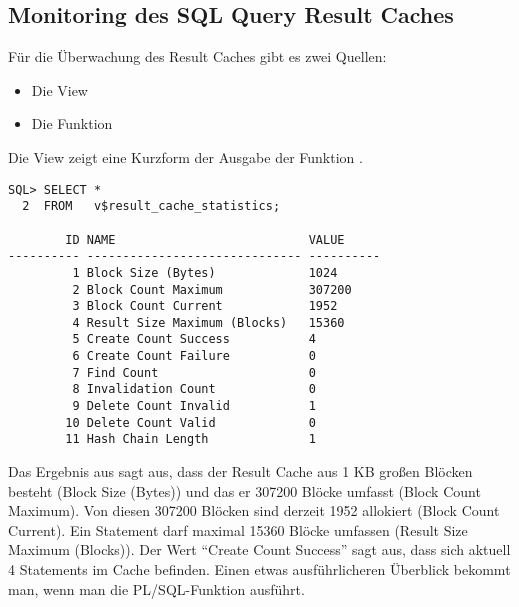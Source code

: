       \subsection{Monitoring des SQL Query Result Caches}
        F\"ur die \"Uberwachung des Result Caches gibt es zwei Quellen:
        \begin{itemize}
          \item Die View 
          \item Die Funktion 
        \end{itemize}
        Die View  zeigt eine Kurzform der Ausgabe der Funktion .
        \begin{lstlisting}[caption={\identifier{v\$result\_cache\_statistics}},label=admin706,language=oracle_sql]
SQL> SELECT *
  2  FROM   v$result_cache_statistics;

        ID NAME                           VALUE
---------- ------------------------------ ----------
         1 Block Size (Bytes)             1024
         2 Block Count Maximum            307200
         3 Block Count Current            1952
         4 Result Size Maximum (Blocks)   15360
         5 Create Count Success           4
         6 Create Count Failure           0
         7 Find Count                     0
         8 Invalidation Count             0
         9 Delete Count Invalid           1
        10 Delete Count Valid             0
        11 Hash Chain Length              1
        \end{lstlisting}
        Das Ergebnis aus  sagt aus, dass der Result Cache aus
        1 KB gro\ss{}en Bl\"ocken besteht (Block Size (Bytes)) und das er 307200
        Bl\"ocke umfasst (Block Count Maximum). Von diesen 307200 Bl\"ocken sind
        derzeit 1952 allokiert (Block Count Current). Ein Statement darf maximal
        15360 Bl\"ocke umfassen (Result Size Maximum (Blocks)). Der Wert
        \enquote{Create Count Success} sagt aus, dass sich aktuell 4 Statements
        im Cache befinden. Einen etwas ausf\"uhrlicheren \"Uberblick bekommt
        man, wenn man die PL/SQL-Funktion
         ausf\"uhrt.
\clearpage
